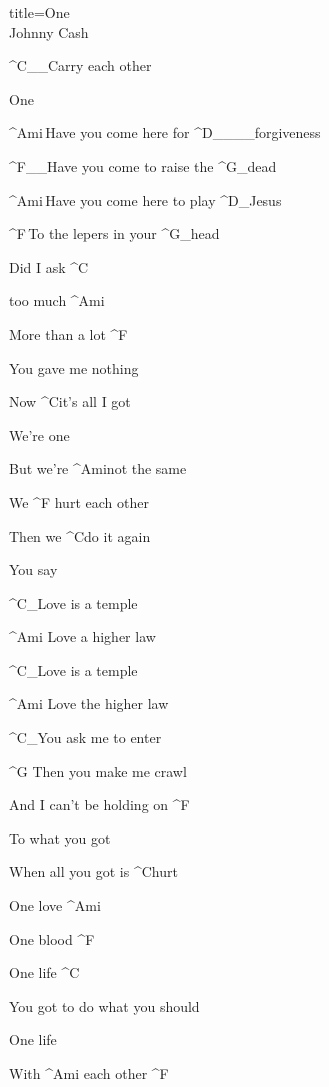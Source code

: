 \begin{song}{title=\centering One \\\normalsize Johnny Cash  \vspace*{-0.3cm}}
{\begin{minipage}[t]{0.55\textwidth}
	^{C{\color{white}\_\_}}Carry each other
 
	One

\end{minipage}\begin{minipage}[t]{0.55\textwidth}\setlength{\parindent}{0.45cm}\vspace*{0.55cm}  %

         
\sloka    
	^{Ami\,}Have you come here for ^{D{\color{white}\_\_\_\_}}forgiveness

	^{F{\color{white}\_\_}}Have you come to raise the ^{G{\color{white}\_}}dead

	^{Ami\,}Have you come here to play ^{D{\color{white}\_}}Jesus

	^{F\,}To the lepers in your ^{G{\color{white}\_}}head


	Did I ask ^{C}

	too much ^{Ami}

	More than a lot ^{F}

	You gave me nothing
            
	Now ^{C}it's all I got

	We're one

	But we're ^{Ami}not the same

	We ^{F\,\,}hurt each other

	Then we ^{C}do it again

	You say
 
 
	^{C{\color{white}\_}}Love is a temple

	^{Ami\,\,}Love a higher law

	^{C{\color{white}\_}}Love is a temple	

	^{Ami\,\,}Love the higher law

	^{C{\color{white}\_}}You ask me to enter

	^{G\,\,}Then you make me crawl

	And I can't be holding on ^{F}
                  
	To what you got

	When all you got is ^{C}hurt
  
  	One love ^{Ami}

 	 One blood ^{F}

 	 One life ^{C}
 
 	 You got to do what you should

 	 One life

 	 With ^{Ami\,\,}each other ^{F}
 

\end{minipage}}
\end{song}
